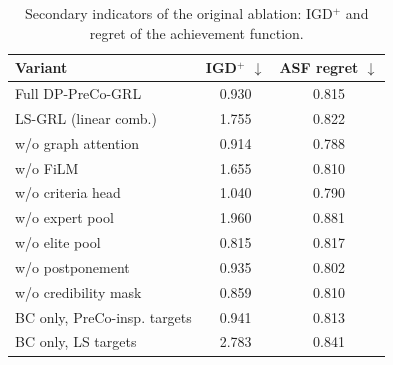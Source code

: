\begin{table}[htbp]
\centering
\caption{Secondary indicators of the original ablation: IGD$^+$ and regret of the achievement function.}
\label{tab:ablation2}
\footnotesize
\setlength{\tabcolsep}{5pt}
\begin{tabular}{lcc}
\toprule
Variant & IGD$^+$ $\downarrow$ & ASF regret $\downarrow$ \\
\midrule
Full DP-PreCo-GRL & 0.930 & 0.815 \\
LS-GRL (linear comb.) & 1.755 & 0.822 \\
w/o graph attention & 0.914 & 0.788 \\
w/o FiLM & 1.655 & 0.810 \\
w/o criteria head & 1.040 & 0.790 \\
w/o expert pool & 1.960 & 0.881 \\
w/o elite pool & 0.815 & 0.817 \\
w/o postponement & 0.935 & 0.802 \\
w/o credibility mask & 0.859 & 0.810 \\
BC only, PreCo-insp. targets & 0.941 & 0.813 \\
BC only, LS targets & 2.783 & 0.841 \\
\bottomrule
\end{tabular}
\end{table}
